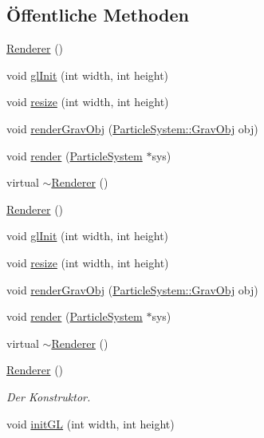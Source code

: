 \subsection*{Öffentliche Methoden}
\begin{DoxyCompactItemize}
\item 
\hyperlink{classRenderer_a7ebf46f54dab9905f79b80f7fddb76a6}{Renderer} ()
\item 
void \hyperlink{classRenderer_a7727c7b56e9dd7c665c969e9ce2611e4}{gl\-Init} (int width, int height)
\item 
void \hyperlink{classRenderer_a9f4493c538688adaad4e4f0575fd3b8d}{resize} (int width, int height)
\item 
void \hyperlink{classRenderer_a1140e0ca0b9637cc87333d88a1582c0d}{render\-Grav\-Obj} (\hyperlink{structParticleSystem_1_1GravObj}{Particle\-System\-::\-Grav\-Obj} obj)
\item 
void \hyperlink{classRenderer_a0580ba6864ba731290380740c0a470e3}{render} (\hyperlink{classParticleSystem}{Particle\-System} $\ast$sys)
\item 
virtual \hyperlink{classRenderer_afeee408862d5bd6255a6882d47e6d5cd}{$\sim$\-Renderer} ()
\item 
\hyperlink{classRenderer_a7ebf46f54dab9905f79b80f7fddb76a6}{Renderer} ()
\item 
void \hyperlink{classRenderer_a7727c7b56e9dd7c665c969e9ce2611e4}{gl\-Init} (int width, int height)
\item 
void \hyperlink{classRenderer_a9f4493c538688adaad4e4f0575fd3b8d}{resize} (int width, int height)
\item 
void \hyperlink{classRenderer_a1140e0ca0b9637cc87333d88a1582c0d}{render\-Grav\-Obj} (\hyperlink{structParticleSystem_1_1GravObj}{Particle\-System\-::\-Grav\-Obj} obj)
\item 
void \hyperlink{classRenderer_a0580ba6864ba731290380740c0a470e3}{render} (\hyperlink{classParticleSystem}{Particle\-System} $\ast$sys)
\item 
virtual \hyperlink{classRenderer_aba42b60392775e4a492c4d14d4fff29f}{$\sim$\-Renderer} ()
\item 
\hyperlink{classRenderer_a7ebf46f54dab9905f79b80f7fddb76a6}{Renderer} ()
\begin{DoxyCompactList}\small\item\em Der Konstruktor. \end{DoxyCompactList}\item 
void \hyperlink{classRenderer_a01887363ad27267e44c1ea0f63761a5c}{init\-G\-L} (int width, int height)

\end{DoxyCompactItemize}
